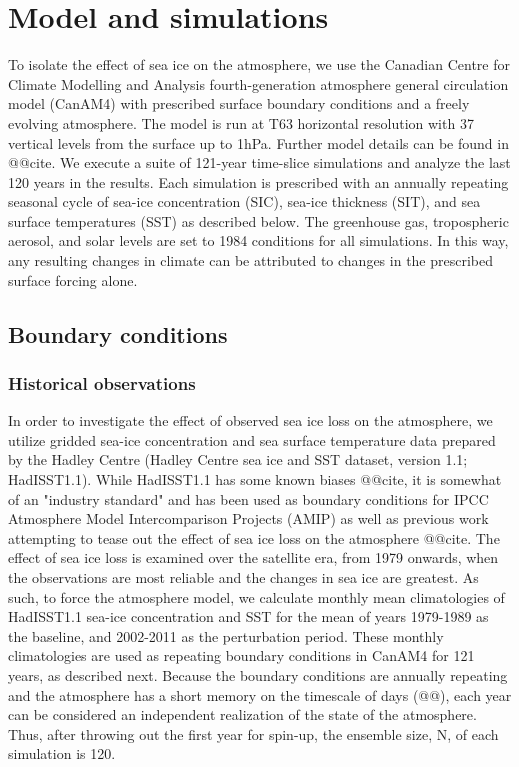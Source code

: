\documentclass[twocol]{ametsoc}
\begin{document}
\section{Model and simulations}

To isolate the effect of sea ice on the atmosphere, we use the Canadian Centre for Climate Modelling and Analysis fourth-generation atmosphere general circulation model (CanAM4) with prescribed surface boundary conditions and a freely evolving atmosphere. The model is run at T63 horizontal resolution with 37 vertical levels from the surface up to 1hPa. Further model details can be found in @@cite. We execute a suite of 121-year time-slice simulations and analyze the last 120 years in the results. Each simulation is prescribed with an annually repeating seasonal cycle of sea-ice concentration (SIC), sea-ice thickness (SIT), and sea surface temperatures (SST) as described below. The greenhouse gas, tropospheric aerosol, and solar levels are set to 1984 conditions for all simulations. In this way, any resulting changes in climate can be attributed to changes in the prescribed surface forcing alone.

\subsection{Boundary conditions}
\subsubsection{Historical observations}

In order to investigate the effect of observed sea ice loss on the atmosphere, we utilize gridded sea-ice concentration and sea surface temperature data prepared by the Hadley Centre (Hadley Centre sea ice and SST dataset, version 1.1; HadISST1.1). While HadISST1.1 has some known biases @@cite, it is somewhat of an "industry standard" and has been used as boundary conditions for IPCC Atmosphere Model Intercomparison Projects (AMIP) as well as previous work attempting to tease out the effect of sea ice loss on the atmosphere @@cite. The effect of sea ice loss is examined over the satellite era, from 1979 onwards, when the observations are most reliable and the changes in sea ice are greatest. As such, to force the atmosphere model, we calculate monthly mean climatologies of HadISST1.1 sea-ice concentration and SST for the mean of years 1979-1989 as the baseline, and 2002-2011 as the perturbation period. These monthly climatologies are used as repeating boundary conditions in CanAM4 for 121 years, as described next. Because the boundary conditions are annually repeating and the atmosphere has a short memory on the timescale of days (@@), each year can be considered an independent realization of the state of the atmosphere. Thus, after throwing out the first year for spin-up, the ensemble size, N, of each simulation is 120. 
\end{document}
